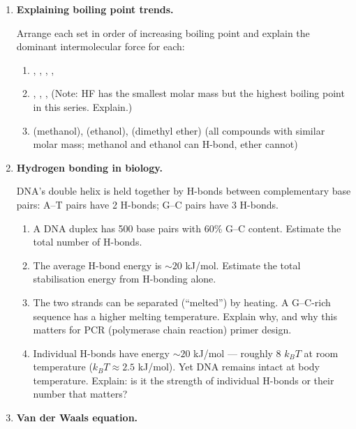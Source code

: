 \documentclass[12pt, a4paper]{book}
\begin{document}
\begin{problembox}
\begin{enumerate}[label=\textbf{\arabic*.}]
  \item \textbf{Explaining boiling point trends.}

    Arrange each set in order of increasing boiling point
    and explain the dominant intermolecular force for each:
    \begin{enumerate}[label=(\alph*)]
      \item {}, , , , 
      \item {}, , , 
            (Note: HF has the smallest molar mass but the
            highest boiling point in this series. Explain.)
      \item {} (methanol),  (ethanol),
             (dimethyl ether)
            (all  compounds with similar molar mass;
            methanol and ethanol can H-bond, ether cannot)
    \end{enumerate}

  \item \textbf{Hydrogen bonding in biology.}

    DNA's double helix is held together by H-bonds between
    complementary base pairs:
    A--T pairs have 2 H-bonds; G--C pairs have 3 H-bonds.
    \begin{enumerate}[label=(\alph*)]
      \item A DNA duplex has 500 base pairs with 60\% G--C
            content.
            Estimate the total number of H-bonds.
      \item The average H-bond energy is $\sim 20$ kJ/mol.
            Estimate the total stabilisation energy from
            H-bonding alone.
      \item The two strands can be separated (``melted'')
            by heating.
            A G--C-rich sequence has a higher melting temperature.
            Explain why, and why this matters for PCR
            (polymerase chain reaction) primer design.
      \item Individual H-bonds have energy $\sim 20$ kJ/mol ---
            roughly 8 $k_BT$ at room temperature ($k_BT \approx 2.5$ kJ/mol).
            Yet DNA remains intact at body temperature.
            Explain: is it the strength of individual H-bonds
            or their number that matters?
    \end{enumerate}

  \item \textbf{Van der Waals equation.}


\end{enumerate}
\end{problembox}
\end{document}
